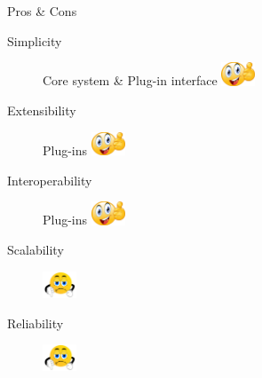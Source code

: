 \documentclass{slide}
\begin{document}
\begin{frame}{Pros \& Cons}
    \vspace{1mm}
    {\huge
    \begin{description}
        \item[Simplicity] Core system \& Plug-in interface \tabto{15em}\includegraphics[width=10mm]{../../shared/images/thumbs-up.png}
        \item[Extensibility] Plug-ins \tabto{15em}\includegraphics[width=10mm]{../../shared/images/thumbs-up.png}
        \item[Interoperability] Plug-ins \tabto{15em}\includegraphics[width=10mm]{../../shared/images/thumbs-up.png}
        \item[Scalability] \tabto{15em}\includegraphics[trim=22 19 22 15,clip,width=10mm]{../../shared/images/thumbs-down.png}
        \item[Reliability] \tabto{15em}\includegraphics[trim=22 19 22 15,clip,width=10mm]{../../shared/images/thumbs-down.png}
    \end{description}
    }
\end{frame}
\end{document}
